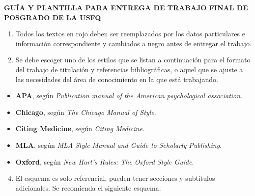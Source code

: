 \pagestyle{emptyusfq}

\begin{center}
{\bfseries\fontsize{18}{22}\selectfont GUÍA Y PLANTILLA PARA ENTREGA DE TRABAJO FINAL DE POSGRADO DE LA USFQ}
\end{center}


\begin{enumerate}
  \item Todos los textos en rojo deben ser reemplazados por los datos particulares e información correspondiente y cambiados a negro antes de entregar el trabajo.
  \item Se debe escoger uno de los estilos que se listan a continuación para el formato del trabajo de titulación y referencias bibliográficas, o aquel que se ajuste a las necesidades del área de conocimiento en la que está trabajando.
\end{enumerate}


\begin{itemize}
  \item \textbf{APA}, según \textit{Publication manual of the American psychological association}.
  \item \textbf{Chicago}, según \textit{The Chicago Manual of Style}.
  \item \textbf{Citing Medicine}, según \textit{Citing Medicine}.
  \item \textbf{MLA}, según \textit{MLA Style Manual and Guide to Scholarly Publishing}.
  \item \textbf{Oxford}, según \textit{New Hart's Rules: The Oxford Style Guide}.
\end{itemize}

\begin{enumerate}
  \setcounter{enumi}{3}
  \item El esquema es solo referencial, pueden tener secciones y subtítulos adicionales. Se recomienda el siguiente esquema:
\end{enumerate}

